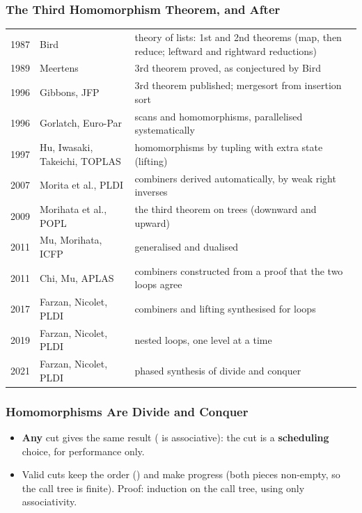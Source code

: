 \begin{frame}[vertical-alignment = top]
  \frametitle{The Third Homomorphism Theorem, and After}
  \vspace*{2mm}
  \begin{center}
    \scriptsize
    \renewcommand\arraystretch{1.05}
    \begin{tabular}{@{}l@{\quad}l@{\quad}>{\raggedright\arraybackslash}p{72mm}@{}}
      1987 & Bird & theory of lists: 1st and 2nd theorems (map, then
        reduce; leftward and rightward reductions) \\
      1989 & Meertens & 3rd theorem proved, as conjectured by Bird \\
      1996 & Gibbons, JFP & 3rd theorem published; mergesort from
        insertion sort \\
      1996 & Gorlatch, Euro-Par & scans and homomorphisms, parallelised
        systematically \\
      1997 & Hu, Iwasaki, Takeichi, TOPLAS & homomorphisms by tupling
        with extra state (lifting) \\
      2007 & Morita et al., PLDI & combiners derived automatically, by
        weak right inverses \\
      2009 & Morihata et al., POPL & the third theorem on trees (downward
        and upward) \\
      2011 & Mu, Morihata, ICFP & generalised and dualised \\
      2011 & Chi, Mu, APLAS & combiners constructed from a proof that the
        two loops agree \\
      2017 & Farzan, Nicolet, PLDI & combiners and lifting synthesised for
        loops \\
      2019 & Farzan, Nicolet, PLDI & nested loops, one level at a time \\
      2021 & Farzan, Nicolet, PLDI & phased synthesis of divide and
        conquer \\
    \end{tabular}
  \end{center}
\end{frame}

\begin{frame*}[vertical-alignment = top]
  \frametitle{Homomorphisms Are Divide and Conquer}
  \vspace*{2.5mm}
  \footnotesize
  \begin{itemize}
    \item \textbf{Any} cut gives the same result ( is
      associative): the cut is a \textbf{scheduling} choice, for
      performance only.
    \item Valid cuts keep the order () and make
      progress (both pieces non-empty, so the call tree is finite). Proof:
      induction on the call tree, using only associativity.
  \end{itemize}
\end{frame*}

